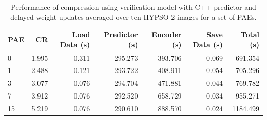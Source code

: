 \begin{table}[hb!]
	\caption{Performance of compression using verification model with C++ predictor and delayed weight updates averaged over ten HYPSO-2 images for a set of PAEs.}
	\label{tab:coastline-compress}
	\begin{center}
		\begin{tabular}{lrrrrrr}
			\hline
			\textbf{PAE} & \textbf{CR} & \textbf{Load Data (s)} & \textbf{Predictor (s)} & \textbf{Encoder (s)} & \textbf{Save Data (s)} & \textbf{Total (s)} \\
			\hline
			0            & 1.995       & 0.311                  & 295.273                & 393.706              & 0.069                  & 691.354            \\
			1            & 2.488       & 0.121                  & 293.722                & 408.911              & 0.054                  & 705.296            \\
			3            & 3.077       & 0.076                  & 294.704                & 471.881              & 0.044                  & 769.782            \\
			7            & 3.912       & 0.076                  & 292.520                & 658.729              & 0.034                  & 955.271            \\
			15           & 5.219       & 0.076                  & 290.610                & 888.570              & 0.024                  & 1184.499           \\
			\hline
		\end{tabular}
	\end{center}
\end{table}

